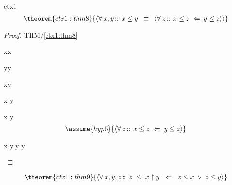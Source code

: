\documentclass[12pt]{amsart}
\begin{document}
\begin{context}{ctx1}
\begin{align}
\theorem{ctx1:thm8}{ \qforall{x,y}{}{ x\le y \2\equiv 
	\qforall{z}{}{x \le z \1\follows y \le z } } }
\end{align}

\begin{proof}{THM/\ref{ctx1:thm8}}
	\begin{free:var}{x}{x}
	\begin{free:var}{y}{y} \\
\begin{by:parts}
\begin{part:a}{ x\le y \2\implies 
		 }
\begin{calculation}
	\hint{\follows}{ \eqref{ctx1:thm6} }
		x  \le y
\end{calculation}
\end{part:a}
\begin{part:a}{ x \le y \2\follows
		 }
	\begin{align}
	\assume{hyp6}{ \qforall{z}{}{x \le z \1\follows y \le z } }
	\end{align}
\begin{calculation}
		x \le y
	\hint{\follows}{ \eqref{hyp6} }
		y  \le y
	\hint{=}{ \eqref{ctx1:axm0} }
		\true
\end{calculation}
\end{part:a}
\end{by:parts}
	\end{free:var}
	\end{free:var}
\end{proof}

\begin{align}
\theorem{ctx1:thm9}{ \qforall{x,y,z}{ }{ z \1\le x \uparrow y \2\follows z \le x \1\lor z\le y  } }
\end{align}


\end{context}
\end{document}

